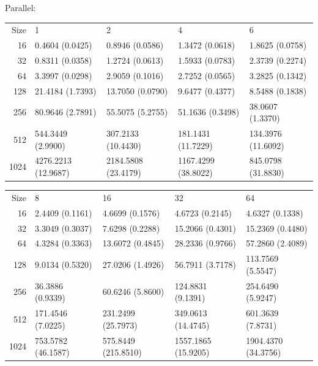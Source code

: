 \documentclass{article}
\begin{document}
Parallel: 
\begin{center}
\begin{tabular}{rllll}
 Size  &  1                    &  2                    &  4                    &  6                   \\
   16  &  0.4604 (0.0425)      &  0.8946 (0.0586)      &  1.3472 (0.0618)      &  1.8625 (0.0758)     \\
   32  &  0.8311 (0.0358)      &  1.2724 (0.0613)      &  1.5933 (0.0783)      &  2.3739 (0.2274)     \\
   64  &  3.3997 (0.0298)      &  2.9059 (0.1016)      &  2.7252 (0.0565)      &  3.2825 (0.1342)     \\
  128  &  21.4184 (1.7393)     &  13.7050 (0.0790)     &  9.6477 (0.4377)      &  8.5488 (0.1838)     \\
  256  &  80.9646 (2.7891)     &  55.5075 (5.2755)     &  51.1636 (0.3498)     &  38.0607 (1.3370)    \\
  512  &  544.3449 (2.9900)    &  307.2133 (10.4430)   &  181.1431 (11.7229)   &  134.3976 (11.6092)  \\
 1024  &  4276.2213 (12.9687)  &  2184.5808 (23.4179)  &  1167.4299 (38.8022)  &  845.0798 (31.8830)  \\
\end{tabular}
\end{center}


\begin{center}
\begin{tabular}{rllll}
 Size  &  8                   &  16                   &  32                   &  64                   \\
   16  &  2.4409 (0.1161)     &  4.6699 (0.1576)      &  4.6723 (0.2145)      &  4.6327 (0.1338)      \\
   32  &  3.3049 (0.3037)     &  7.6298 (0.2288)      &  15.2066 (0.4301)     &  15.2369 (0.4480)     \\
   64  &  4.3284 (0.3363)     &  13.6072 (0.4845)     &  28.2336 (0.9766)     &  57.2860 (2.4089)     \\
  128  &  9.0134 (0.5320)     &  27.0206 (1.4926)     &  56.7911 (3.7178)     &  113.7569 (5.5547)    \\
  256  &  36.3886 (0.9339)    &  60.6246 (5.8600)     &  124.8831 (9.1391)    &  254.6490 (5.9247)    \\
  512  &  171.4546 (7.0225)   &  231.2499 (25.7973)   &  349.0613 (14.4745)   &  601.3639 (7.8731)    \\
 1024  &  753.5782 (46.1587)  &  575.8449 (215.8510)  &  1557.1865 (15.9205)  &  1904.4370 (34.3756)  \\
\end{tabular}
\end{center}
\end{document}
